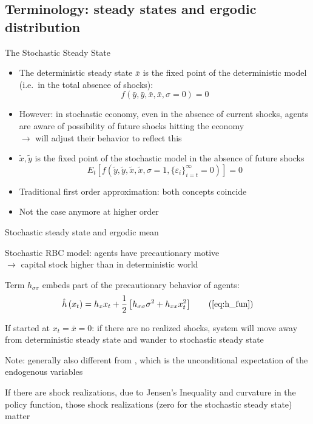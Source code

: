 \subsection{Terminology: steady states and ergodic distribution}
\renewcommand{\Source}{\textcite{Coeurdacier2011}}
\begin{frame}{The Stochastic Steady State}
  \begin{itemize}
    \item The deterministic steady state $\bar x$ is the fixed point of the deterministic model (i.e.\ in the total absence of shocks):
          \[
            f\left( {\bar y,\bar y,\bar x,\bar x},\sigma=0 \right) = 0
          \]
    \item However: in stochastic economy, even in the absence of current shocks, agents are aware of possibility of future shocks hitting the economy\\
          $\rightarrow$ will adjust their behavior to reflect this
    \item {} $\tilde x,\tilde y$ is the fixed point of the stochastic model in the absence of future shocks
          \begin{equation}
            E_t\left[f\left( {\tilde y,\tilde  y,\tilde  x,\tilde  x},\sigma=1,\{\varepsilon_i\}_{i=t}^{\infty}=0 \right)\right] = 0
          \end{equation}
    \item Traditional first order approximation: both concepts coincide
    \item Not the case anymore at higher order
  \end{itemize}
\end{frame}

\begin{frame}{Stochastic steady state and ergodic mean}
  \begin{witemize}
    \item Stochastic RBC model: agents have precautionary motive\\
    $\rightarrow$ capital stock higher than in deterministic world
    \item Term $h_{\sigma\sigma}$ embeds part of the precautionary behavior of agents:
    \begin{equation}
      \hat h\left( {{x_t}} \right) = {h_x}{x_t} +\frac{1}{2}\left[ {h_{\sigma \sigma }}{\sigma ^2} + {h_{xx}}x_t^2 \right] \tag{\ref{eq:h_fun}}
    \end{equation}
    \item If started at $x_t=\bar x=0$: if there are no realized shocks, system will move away from deterministic steady state and wander to stochastic steady state
    \item Note: generally also different from , which is the unconditional expectation of the endogenous variables
    \item If there are shock realizations, due to Jensen's Inequality and curvature in the policy function, those shock realizations (zero for the stochastic steady state) matter
  \end{witemize}
\end{frame}



